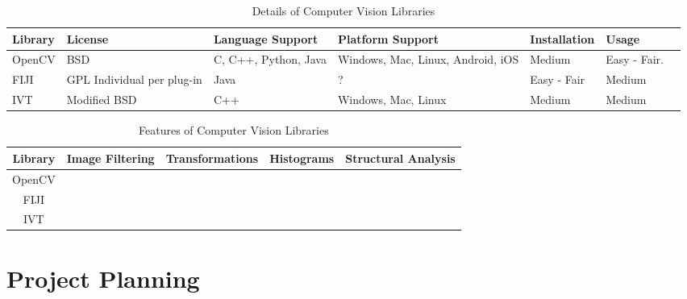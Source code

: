 \documentclass[11pt,fleqn,twoside]{article}
\begin{document}


\begin{table}[p]
\begin{tabular}{| p{6em} | p{6em} | p{6em} | p{6em} | p{6em} | p{6em} | p{6em} |}
\hline
\textbf{Library} & \textbf{License} & \textbf{Language Support} & \textbf{Platform Support} & 
\textbf{Installation} & \textbf{Usage}\\ \hline

OpenCV & BSD & C, C++, Python, Java & Windows, Mac, Linux, Android, iOS & Medium & Easy - Fair. \\ \hline

FIJI & GPL \newline Individual per plug-in & Java & ? & Easy - Fair & Medium \\ \hline

IVT & Modified BSD & C++ & Windows, Mac, Linux & Medium & Medium \\ \hline

\hline
\end{tabular}
\caption{Details of Computer Vision Libraries}
\end{table}

\begin{table}[p]
\begin{tabular}{| c | c | c | c | c |}
\hline
\textbf{Library} & \textbf{Image Filtering} & \textbf{Transformations} & \textbf{Histograms} & \textbf{Structural Analysis} \\ \hline

OpenCV 	& \checkmark	& \checkmark	& \checkmark	& \checkmark 	\\ \hline
FIJI	& 		&		&		&		\\ \hline
IVT	&		&		&		&		\\ \hline
\end{tabular}
\caption{Features of Computer Vision Libraries}
\end{table}

\section{Project Planning}


\end{document}
